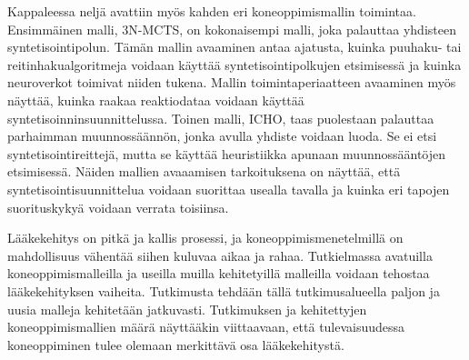 \documentclass[finnish,twoside,censored,tkt,sw-line]{HYthesisML}
\begin{document}
Kappaleessa neljä avattiin myös kahden eri koneoppimismallin toimintaa.
Ensimmäinen malli, 3N-MCTS, on kokonaisempi malli, joka palauttaa yhdisteen syntetisointipolun.
Tämän mallin avaaminen antaa ajatusta, kuinka puuhaku- tai reitinhakualgoritmeja voidaan käyttää syntetisointipolkujen etsimisessä ja kuinka neuroverkot toimivat niiden tukena.
Mallin toimintaperiaatteen avaaminen myös näyttää, kuinka raakaa reaktiodataa voidaan käyttää syntetisoinninsuunnittelussa.
Toinen malli, ICHO, taas puolestaan palauttaa parhaimman muunnossäännön, jonka avulla yhdiste voidaan luoda.
Se ei etsi syntetisointireittejä, mutta se käyttää heuristiikka apunaan muunnossääntöjen etsimisessä.
Näiden mallien avaaamisen tarkoituksena on näyttää, että syntetisointisuunnittelua voidaan suorittaa usealla tavalla ja kuinka eri tapojen suorituskykyä voidaan verrata toisiinsa.

Lääkekehitys on pitkä ja kallis prosessi, ja koneoppimismenetelmillä on mahdollisuus vähentää siihen kuluvaa aikaa ja rahaa.
Tutkielmassa avatuilla koneoppimismalleilla ja useilla muilla kehitetyillä malleilla voidaan tehostaa lääkekehityksen vaiheita.
Tutkimusta tehdään tällä tutkimusalueella paljon ja uusia malleja kehitetään jatkuvasti.
Tutkimuksen ja kehitettyjen koneoppimismallien määrä näyttääkin viittaavaan, että tulevaisuudessa koneoppiminen tulee olemaan merkittävä osa lääkekehitystä.

\cleardoublepage{}                          %
\printbibliography{}

\backmatter{}



\end{document}
